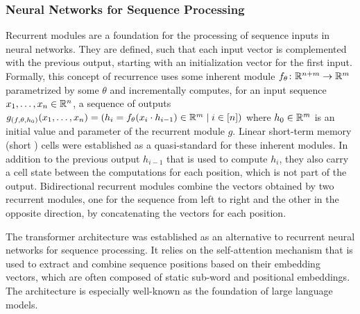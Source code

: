 \documentclass[../document.tex]{subfiles}
\begin{document}
    \subsubsection{Neural Networks for Sequence Processing}
    Recurrent modules are a foundation for the processing of sequence inputs in neural networks.
    They are defined, such that each input vector is complemented with the previous output, starting with an initialization vector for the first input.
    Formally, this concept of recurrence uses some inherent module \(f_\theta\colon \mathbb{R}^{n+m} \to \mathbb{R}^m\) parametrized by some \(\theta\) and incrementally computes, for an input sequence \(x_1, \ldots, x_n \in \mathbb{R}^n\), a sequence of outputs \(g_{(f, \theta, h_0)}(x_1, \ldots, x_n) = (h_i = f_\theta(x_i \cdot h_{i-1}) \in \mathbb{R}^m \mid i \in [n])\) where \(h_0 \in \mathbb{R}^m\) is an initial value and parameter of the recurrent module \(g\).
    Linear short-term memory (short ) cells \citep{Hoc97} were established as a quasi-standard for these inherent modules.
    In addition to the previous output \(h_{i-1}\) that is used to compute \(h_i\), they also carry a cell state between the computations for each position, which is not part of the output.
    Bidirectional recurrent modules combine the vectors obtained by two recurrent modules, one for the sequence from left to right and the other in the opposite direction, by concatenating the vectors for each position.

    The transformer architecture \citep{vaswani2017attention} was established as an alternative to recurrent neural networks for sequence processing.
    It relies on the self-attention mechanism that is used to extract and combine sequence positions based on their embedding vectors, which are often composed of static sub-word and positional embeddings.
    The architecture is especially well-known as the foundation of large language models.
\end{document}
